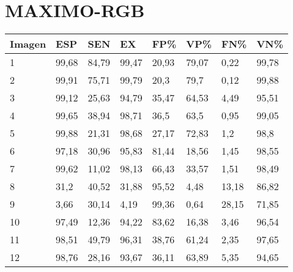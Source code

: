 \section{MAXIMO-RGB}
\begin{longtable}[c]{|l|l|l|l|l|l|l|l|}
\hline
\textbf{Imagen} & \textbf{ESP} & \textbf{SEN} & \textbf{EX} & \textbf{FP\%} & \textbf{VP\%} & \textbf{FN\%} & \textbf{VN\%} \\ \hline
\endfirsthead
%
\endhead
%
1               & 99,68        & 84,79        & 99,47       & 20,93         & 79,07         & 0,22          & 99,78         \\ \hline
2               & 99,91        & 75,71        & 99,79       & 20,3          & 79,7          & 0,12          & 99,88         \\ \hline
3               & 99,12        & 25,63        & 94,79       & 35,47         & 64,53         & 4,49          & 95,51         \\ \hline
4               & 99,65        & 38,94        & 98,71       & 36,5          & 63,5          & 0,95          & 99,05         \\ \hline
5               & 99,88        & 21,31        & 98,68       & 27,17         & 72,83         & 1,2           & 98,8          \\ \hline
6               & 97,18        & 30,96        & 95,83       & 81,44         & 18,56         & 1,45          & 98,55         \\ \hline
7               & 99,62        & 11,02        & 98,13       & 66,43         & 33,57         & 1,51          & 98,49         \\ \hline
8               & 31,2         & 40,52        & 31,88       & 95,52         & 4,48          & 13,18         & 86,82         \\ \hline
9               & 3,66         & 30,14        & 4,19        & 99,36         & 0,64          & 28,15         & 71,85         \\ \hline
10              & 97,49        & 12,36        & 94,22       & 83,62         & 16,38         & 3,46          & 96,54         \\ \hline
11              & 98,51        & 49,79        & 96,31       & 38,76         & 61,24         & 2,35          & 97,65         \\ \hline
12              & 98,76        & 28,16        & 93,67       & 36,11         & 63,89         & 5,35          & 94,65         \\ \hline

\end{longtable}
